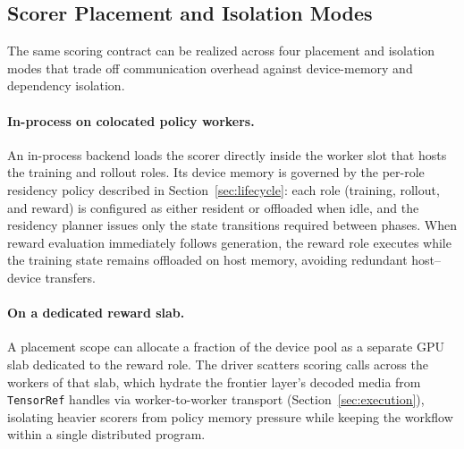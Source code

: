 \subsection{Scorer Placement and Isolation Modes}
\label{sec:reward-placement}

The same scoring contract can be realized across four placement and isolation modes that trade off communication overhead against device-memory and dependency isolation.

\paragraph{In-process on colocated policy workers.}
An in-process backend loads the scorer directly inside the worker slot that hosts the training and rollout roles.
Its device memory is governed by the per-role residency policy described in Section~\ref{sec:lifecycle}: each role (training, rollout, and reward) is configured as either resident or offloaded when idle, and the residency planner issues only the state transitions required between phases.
When reward evaluation immediately follows generation, the reward role executes while the training state remains offloaded on host memory, avoiding redundant host--device transfers.

\paragraph{On a dedicated reward slab.}
A placement scope can allocate a fraction of the device pool as a separate GPU slab dedicated to the reward role.
The driver scatters scoring calls across the workers of that slab, which hydrate the frontier layer's decoded media from \texttt{TensorRef} handles via worker-to-worker transport (Section~\ref{sec:execution}), isolating heavier scorers from policy memory pressure while keeping the workflow within a single distributed program.

